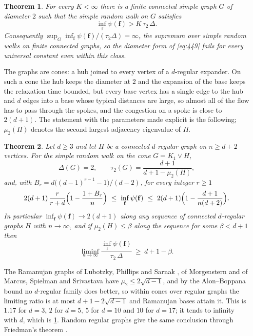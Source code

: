 \documentclass[11pt]{amsart}
\newtheorem{theorem}{Theorem}[section]
\theoremstyle{definition}
\newcommand{\bfF}{\mathbf{f}}
\begin{document}
\begin{theorem}\label{thm:main}
For every $K<\infty$ there is a finite connected simple graph $G$ of diameter $2$ such that the simple random walk on $G$ satisfies
\[
\inf_{\bfF}\psi(\bfF)>K\,\tau_2\,\Delta .
\]
Consequently $\sup_G\inf_{\bfF}\psi(\bfF)/(\tau_2\Delta)=\infty$, the supremum over simple random walks on finite connected graphs, so the diameter form of \eqref{eq:449} fails for every universal constant even within this class.
\end{theorem}

The graphs are cones: a hub joined to every vertex of a $d$-regular expander. On such a cone the hub keeps the diameter at $2$ and the expansion of the base keeps the relaxation time bounded, but every base vertex has a single edge to the hub and $d$ edges into a base whose typical distances are large, so almost all of the flow has to pass through the spokes, and the congestion on a spoke is close to $2(d+1)$. The statement with the parameters made explicit is the following; $\mu_2(H)$ denotes the second largest adjacency eigenvalue of $H$.

\begin{theorem}\label{thm:cone}
Let $d\ge3$ and let $H$ be a connected $d$-regular graph on $n\ge d+2$ vertices. For the simple random walk on the cone $G=K_1\vee H$,
\[
\Delta(G)=2,\qquad \tau_2(G)=\frac{d+1}{d+1-\mu_2(H)},
\]
and, with $B_r=d\bigl((d-1)^{r-1}-1\bigr)/(d-2)$, for every integer $r\ge1$
\begin{equation}\label{eq:twosided}
2(d+1)\,\frac r{r+d}\Bigl(1-\frac{1+B_r}n\Bigr)\ \le\ \inf_{\bfF}\psi(\bfF)\ \le\ 2(d+1)\Bigl(1-\frac{d+1}{n(d+2)}\Bigr).
\end{equation}
In particular $\inf_{\bfF}\psi(\bfF)\to2(d+1)$ along any sequence of connected $d$-regular graphs $H$ with $n\to\infty$, and if $\mu_2(H)\le\beta$ along the sequence for some $\beta<d+1$ then
\[
\liminf_{n\to\infty}\frac{\inf_{\bfF}\psi(\bfF)}{\tau_2\,\Delta}\ \ge\ d+1-\beta .
\]
\end{theorem}

The Ramanujan graphs of Lubotzky, Phillips and Sarnak \cite{LPS}, of Morgenstern \cite{Morgenstern} and of Marcus, Spielman and Srivastava \cite{MSS} have $\mu_2\le2\sqrt{d-1}$, and by the Alon--Boppana bound \cite{Nilli} no $d$-regular family does better, so within cones over regular graphs the limiting ratio is at most $d+1-2\sqrt{d-1}$ and Ramanujan bases attain it. This is $1.17$ for $d=3$, $2$ for $d=5$, $5$ for $d=10$ and $10$ for $d=17$; it tends to infinity with $d$, which is \cref{thm:main}. Random regular graphs give the same conclusion through Friedman's theorem \cite{Friedman,Bordenave}.
\end{document}
